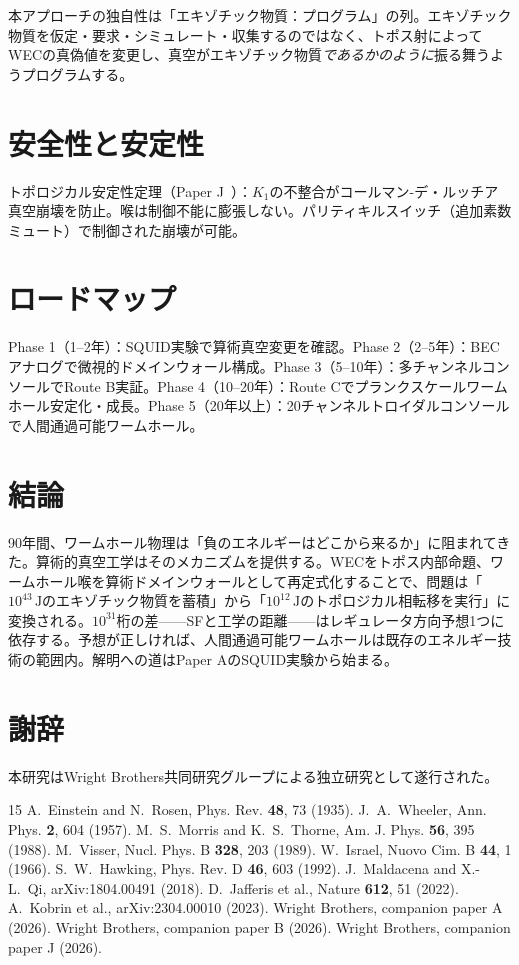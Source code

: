 \documentclass[11pt,a4paper]{article}
\begin{document}
本アプローチの独自性は「エキゾチック物質：プログラム」の列。エキゾチック物質を仮定・要求・シミュレート・収集するのではなく、トポス射によってWECの真偽値を変更し、真空がエキゾチック物質\emph{であるかのように}振る舞うようプログラムする。

\section{安全性と安定性}

トポロジカル安定性定理（Paper J~\cite{paper_J}）：$K_1$の不整合がコールマン-デ・ルッチア真空崩壊を防止。喉は制御不能に膨張しない。パリティキルスイッチ（追加素数ミュート）で制御された崩壊が可能。

\section{ロードマップ}

Phase 1（1--2年）：SQUID実験で算術真空変更を確認。Phase 2（2--5年）：BECアナログで微視的ドメインウォール構成。Phase 3（5--10年）：多チャンネルコンソールでRoute B実証。Phase 4（10--20年）：Route Cでプランクスケールワームホール安定化・成長。Phase 5（20年以上）：20チャンネルトロイダルコンソールで人間通過可能ワームホール。

\section{結論}

90年間、ワームホール物理は「負のエネルギーはどこから来るか」に阻まれてきた。算術的真空工学はそのメカニズムを提供する。WECをトポス内部命題、ワームホール喉を算術ドメインウォールとして再定式化することで、問題は「$10^{43}\,\mathrm{J}$のエキゾチック物質を蓄積」から「$10^{12}\,\mathrm{J}$のトポロジカル相転移を実行」に変換される。$10^{31}$桁の差——SFと工学の距離——はレギュレータ方向予想1つに依存する。予想が正しければ、人間通過可能ワームホールは既存のエネルギー技術の範囲内。解明への道はPaper AのSQUID実験から始まる。

\section*{謝辞}
本研究はWright Brothers共同研究グループによる独立研究として遂行された。

\begin{thebibliography}{15}
 A.~Einstein and N.~Rosen, Phys. Rev. \textbf{48}, 73 (1935).
 J.~A.~Wheeler, Ann. Phys. \textbf{2}, 604 (1957).
 M.~S.~Morris and K.~S.~Thorne, Am. J. Phys. \textbf{56}, 395 (1988).
 M.~Visser, Nucl. Phys. B \textbf{328}, 203 (1989).
 W.~Israel, Nuovo Cim. B \textbf{44}, 1 (1966).
 S.~W.~Hawking, Phys. Rev. D \textbf{46}, 603 (1992).
 J.~Maldacena and X.-L.~Qi, arXiv:1804.00491 (2018).
 D.~Jafferis et al., Nature \textbf{612}, 51 (2022).
 A.~Kobrin et al., arXiv:2304.00010 (2023).
 Wright Brothers, companion paper A (2026).
 Wright Brothers, companion paper B (2026).
 Wright Brothers, companion paper J (2026).
\end{thebibliography}
\end{document}
